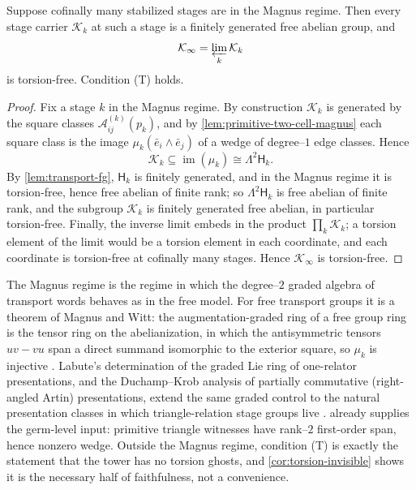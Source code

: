 \begin{theorem}
	\label{thm:magnus-torsion-free}
	Suppose cofinally many stabilized stages are in the Magnus regime.
	Then every stage carrier \(\mathcal K_k\) at such a stage is a
	finitely generated free abelian group, and
	\[
		\mathcal K_\infty=\varprojlim_k\mathcal K_k
	\]
	is torsion-free.  Condition \textup{(T)} holds.
\end{theorem}
\begin{proof}
	Fix a stage \(k\) in the Magnus regime.  By construction
	\(\mathcal K_k\) is generated by the square classes
	\(\mathcal A_{ij}^{(k)}(p_k)\), and by
	\cref{lem:primitive-two-cell-magnus} each square class is the image
	\(\mu_k(\bar e_i\wedge\bar e_j)\) of a wedge of degree--\(1\) edge
	classes.  Hence
	\[
		\mathcal K_k\subseteq\operatorname{im}(\mu_k)\cong\Lambda^2\mathsf H_k .
	\]
	By \cref{lem:transport-fg}, \(\mathsf H_k\) is finitely generated,
	and in the Magnus regime it is torsion-free, hence free abelian of
	finite rank; so \(\Lambda^2\mathsf H_k\) is free abelian of finite
	rank, and the subgroup \(\mathcal K_k\) is finitely generated free
	abelian, in particular torsion-free.
	Finally, the inverse limit embeds in the product
	\(\prod_k\mathcal K_k\); a torsion element of the limit would be a
	torsion element in each coordinate, and each coordinate is
	torsion-free at cofinally many stages.  Hence
	\(\mathcal K_\infty\) is torsion-free.
\end{proof}
\begin{remark}
	\label{rem:magnus-scope}
	The Magnus regime is the regime in
	which the degree--\(2\) graded algebra of transport words behaves as
	in the free model.  For free transport groups it is a theorem of
	Magnus and Witt: the augmentation-graded ring of a free group ring is
	the tensor ring on the abelianization, in which the antisymmetric
	tensors \(uv-vu\) span a direct summand isomorphic to the exterior
	square, so \(\mu_k\) is injective \cite{Magnus1935,Witt1937}.
	Labute's determination of the
	graded Lie ring of one-relator presentations, and the
	Duchamp--Krob analysis of partially commutative
	(right-angled Artin) presentations, extend the same graded control to
	the natural presentation classes in which triangle-relation stage
	groups live \cite{Labute1970,DuchampKrob1992}.   already supplies the
	germ-level input: primitive triangle witnesses have rank--\(2\)
	first-order span, hence nonzero wedge.  Outside the Magnus regime,
	condition \textup{(T)} is exactly the statement that the tower has no
	torsion ghosts, and \cref{cor:torsion-invisible} shows it is the
	necessary half of faithfulness, not a convenience.
\end{remark}
